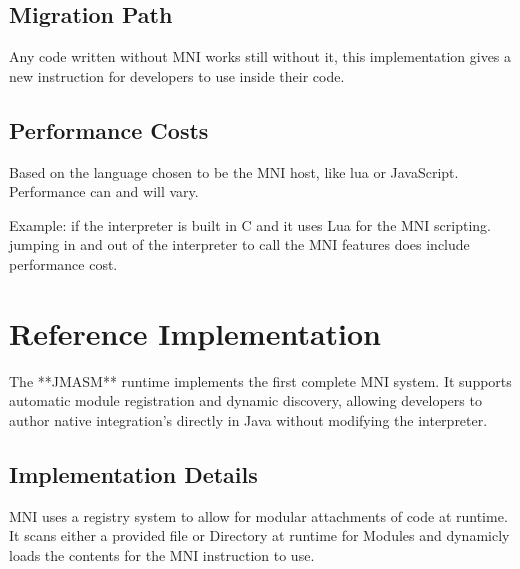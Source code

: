 \documentclass[11pt]{article}
\begin{document}
	
	\subsection{Migration Path}
 	Any code written without MNI works still without it, this implementation gives a new instruction for developers to use inside their code.
	
	\subsection{Performance Costs}
	Based on the language chosen to be the MNI host, like lua or JavaScript.
	Performance can and will vary.
	
	Example: if the interpreter is built in C and it uses Lua for the MNI scripting.
	jumping in and out of the interpreter to call the MNI features does include performance cost.
	
	\section{Reference Implementation}
	The **JMASM** runtime implements the first complete MNI system.  
	It supports automatic module registration and dynamic discovery, allowing developers to author native integration's directly in Java without modifying the interpreter.
	
	\subsection{Implementation Details}
	MNI uses a registry system to allow for modular attachments of code at runtime.
	It scans either a provided file or Directory at runtime for Modules and dynamicly loads the contents for
	the MNI instruction to use.
	

	
\end{document}
